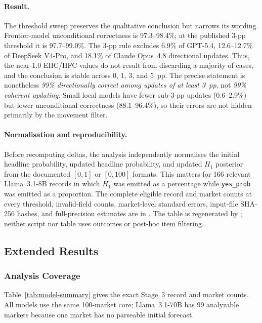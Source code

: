 \paragraph{Result.}
The threshold sweep preserves the qualitative conclusion but narrows its
wording. Frontier-model unconditional correctness is 97.3--98.4\%; at the
published 3-pp threshold it is 97.7--99.0\%. The 3-pp rule excludes 6.9\% of
GPT-5.4, 12.6--12.7\% of DeepSeek V4-Pro, and 18.1\% of Claude Opus~4.8
directional updates. Thus, the near-1.0 EHC/HFC values do not result from
discarding a majority of cases, and the conclusion is stable across 0, 1, 3,
and 5~pp. The precise statement is nonetheless \emph{99\% directionally correct
among updates of at least 3~pp}, not \emph{99\% coherent updating}. Small local
models have fewer sub-3-pp updates (0.6--2.9\%) but lower unconditional
correctness (88.1--96.4\%), so their errors are not hidden primarily by the
movement filter.

\paragraph{Normalisation and reproducibility.}
Before recomputing deltas, the analysis independently normalises the initial
headline probability, updated headline probability, and updated $H_1$
posterior from the documented $[0,1]$ or $[0,100]$ formats. This matters for
166 relevant Llama~3.1-8B records in which $H_1$ was emitted as a percentage
while \texttt{yes\_prob} was emitted as a proportion. The complete eligible
record and market counts at every threshold, invalid-field counts, market-level
standard errors, input-file SHA-256 hashes, and full-precision estimates are in
. The table is
regenerated by
; neither script
nor table uses outcomes or post-hoc item filtering.

\subsection{Extended Results}
\label{app:extended-results}

\subsubsection{Analysis Coverage}
Table~\ref{tab:model-summary} gives the exact Stage~3 record and market counts.
All models use the same 100-market core; Llama~3.1-70B has 99 analyzable markets
because one market has no parseable initial forecast.

